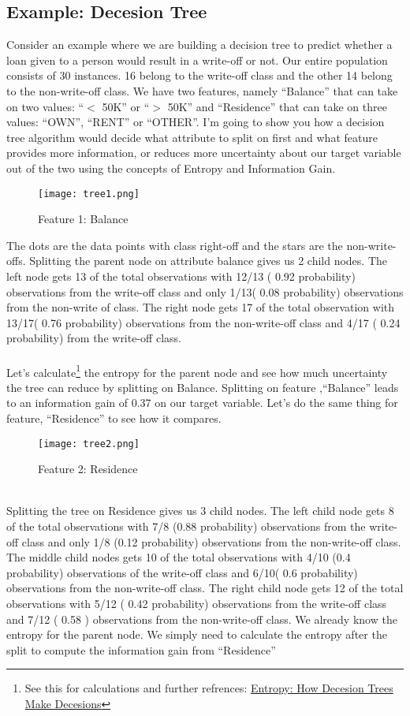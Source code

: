 \documentclass[12pt, A4]{report}
\begin{document}
\subsection*{Example: Decesion Tree}
	Consider an example where we are building a decision tree to predict whether a loan given to a person would result in a write-off or not. Our entire population consists of 30 instances. 16 belong to the write-off class and the other 14 belong to the non-write-off class. We have two features, namely “Balance” that can take on two values: “$<$ 50K” or “$>$ 50K” and “Residence” that can take on three values: “OWN”, “RENT” or “OTHER”. I’m going to show you how a decision tree algorithm would decide what attribute to split on first and what feature provides more information, or reduces more uncertainty about our target variable out of the two using the concepts of Entropy and Information Gain.
	\begin{figure}[h]
		\centering
		\texttt{[image: tree1.png]}
		\caption{Feature 1: Balance}
	\end{figure}
	The dots are the data points with class right-off and the stars are the non-write-offs. Splitting the parent node on attribute balance gives us 2 child nodes. The left node gets 13 of the total observations with 12/13 ( 0.92 probability) observations from the write-off class and only 1/13( 0.08 probability) observations from the non-write of class. The right node gets 17 of the total observation with 13/17( 0.76 probability) observations from the non-write-off class and 4/17 ( 0.24 probability) from the write-off class.
	\\ \\Let’s calculate\footnote[1]{See this for calculations and further refrences: \href{https://towardsdatascience.com/entropy-how-decision-trees-make-decisions-2946b9c18c8}{Entropy: How Decesion Trees Make Decesions}} the entropy for the parent node and see how much uncertainty the tree can reduce by splitting on Balance.	
	Splitting on feature ,“Balance” leads to an information gain of 0.37 on our target variable. Let’s do the same thing for feature, “Residence” to see how it compares.\\ 
	\begin{figure}[h]
		\centering
		\texttt{[image: tree2.png]}
		\caption{Feature 2: Residence}
	\end{figure}
	\\
	Splitting the tree on Residence gives us 3 child nodes. The left child node gets 8 of the total observations with 7/8 (0.88 probability) observations from the write-off class and only 1/8 (0.12 probability) observations from the non-write-off class. The middle child nodes gets 10 of the total observations with 4/10 (0.4 probability) observations of the write-off class and 6/10( 0.6 probability) observations from the non-write-off class. The right child node gets 12 of the total observations with 5/12 ( 0.42 probability) observations from the write-off class and 7/12 ( 0.58 ) observations from the non-write-off class. We already know the entropy for the parent node. We simply need to calculate the entropy after the split to compute the information gain from “Residence”
\end{document}
